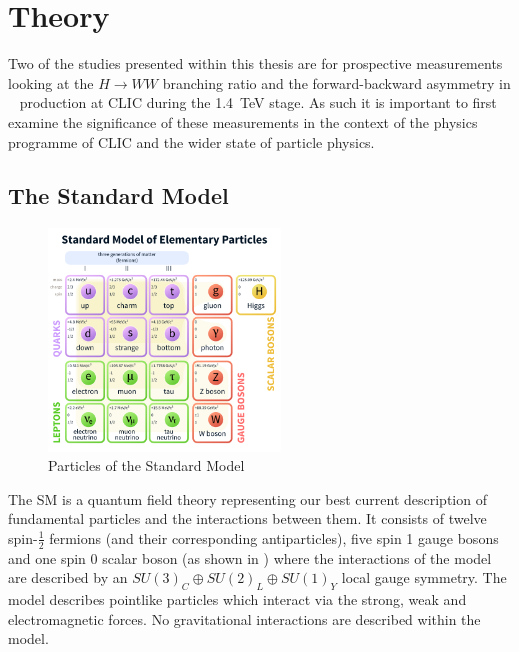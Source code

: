 \chapter{Theory}

Two of the studies presented within this thesis are for prospective measurements looking at the $H\rightarrow WW$ branching ratio and the forward-backward asymmetry in \ttbar~ production at CLIC during the 1.4~TeV stage. As such it is important to first examine the significance of these measurements in the context of the physics programme of CLIC and the wider state of particle physics.


\section{The Standard Model}

\begin{figure}
  \centering
  \includegraphics[width=0.55\textwidth,keepaspectratio]{Theory/fig/smparticles.png}
  \caption[Particles of the Standard Model]{Particles of the Standard Model}
  \label{fig:smparticles}
\end{figure}

The \ac{SM} is a quantum field theory representing our best current description of fundamental particles and the interactions between them. It consists of twelve spin-$\frac{1}{2}$ fermions (and their corresponding antiparticles), five spin 1 gauge bosons and one spin 0 scalar boson (as shown in ) where the interactions of the model are described by an $SU(3)_{C}\oplus SU(2)_{L}\oplus SU(1)_{Y}$ local gauge symmetry. The model describes pointlike particles which interact via the strong, weak and electromagnetic forces. No gravitational interactions are described within the model.

